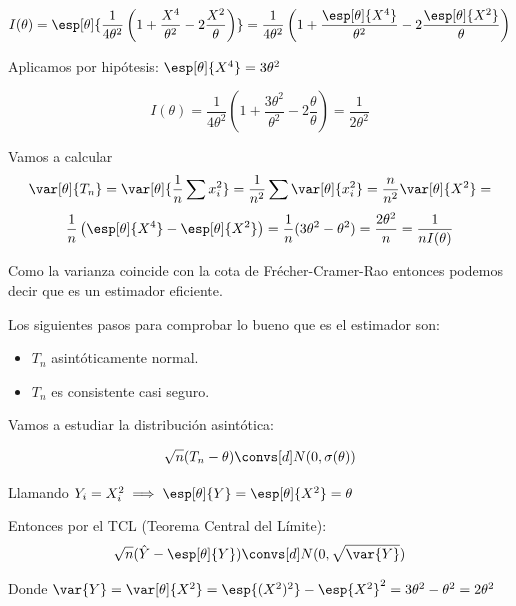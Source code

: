 \begin{problem}[2]
\[I(\theta) = \esp[\theta]{\frac{1}{4\theta^2} \left( 1+\frac{X^4}{\theta^2} - 2\frac{X^2}{\theta}\right)} = \frac{1}{4\theta^2} \left( 1+\frac{\esp[\theta]{X^4}}{\theta^2} - 2\frac{\esp[\theta]{X^2}}{\theta}\right)\]

Aplicamos por hipótesis: $\esp[\theta]{X^4} = 3\theta^2$

\[I(\theta) = \frac{1}{4\theta^2} \left(1+\frac{3\theta^2}{\theta^2} - 2 \frac{\theta}{\theta}\right) = \frac{1}{2\theta^2}\]

Vamos a calcular \[\var[\theta]{T_n} = \var[\theta]{\frac{1}{n}\sum x_i^2} = \frac{1}{n^2}\sum \var[\theta]{x_i^2} = \frac{n}{n^2} \var[\theta]{X^2} =\]
\[ \frac{1}{n}\left(\esp[\theta]{X^4} - \esp[\theta]{X^2}\right) = \frac{1}{n}(3\theta^2-\theta^2) = \frac{2\theta^2}{n} = \frac{1}{nI(\theta)}\]

Como la varianza coincide con la cota de Frécher-Cramer-Rao entonces podemos decir que es un estimador eficiente.

Los siguientes pasos para comprobar lo bueno que es el estimador son: \begin{itemize}
\item $T_n$ asintóticamente normal.
\item $T_n$ es consistente casi seguro.
\end{itemize}

\spart Vamos a estudiar la distribución asintótica:

\[\sqrt{n}(T_n-\theta) \convs[d] N(0,\sigma(\theta))\]

Llamando $Y_i = X_i^2 \implies \esp[\theta]{Y} = \esp[\theta]{X^2} = \theta$

Entonces por el TCL (Teorema Central del Límite): \[\displaystyle \sqrt{n}(\hat{Y} - \esp[\theta]{Y}) \convs[d] N(0,\sqrt{\var{Y}})\]

Donde $\var{Y} = \var[\theta]{X^2} = \esp{(X^2)^2} - \esp{X^2}^2 = 3\theta^2 - \theta^2 = 2\theta^2$
\end{problem}



